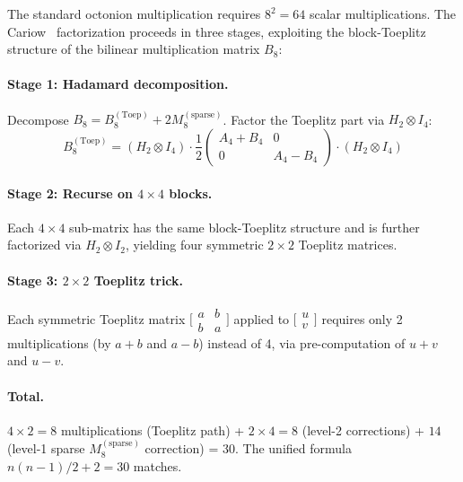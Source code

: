 \documentclass[sigconf,anonymous,review]{acmart}
\begin{document}
The standard octonion multiplication requires $8^2 = 64$ scalar
multiplications. The Cariow~\cite{cariow2012} factorization proceeds
in three stages, exploiting the block-Toeplitz structure of the
bilinear multiplication matrix $B_8$:

\paragraph{Stage 1: Hadamard decomposition.}
Decompose $B_8 = B_8^{(\text{Toep})} + 2M_8^{(\text{sparse})}$.
Factor the Toeplitz part via $H_2 \otimes I_4$:
\begin{equation}
  B_8^{(\text{Toep})} = (H_2 \otimes I_4) \cdot \frac{1}{2}
    \begin{pmatrix} A_4 + B_4 & 0 \\ 0 & A_4 - B_4 \end{pmatrix}
    \cdot (H_2 \otimes I_4)
\end{equation}

\paragraph{Stage 2: Recurse on $4 \times 4$ blocks.}
Each $4 \times 4$ sub-matrix has the same block-Toeplitz structure
and is further factorized via $H_2 \otimes I_2$, yielding four
symmetric $2 \times 2$ Toeplitz matrices.

\paragraph{Stage 3: $2 \times 2$ Toeplitz trick.}
Each symmetric Toeplitz matrix
$\bigl[\begin{smallmatrix} a & b \\ b & a \end{smallmatrix}\bigr]$
applied to $\bigl[\begin{smallmatrix} u \\ v \end{smallmatrix}\bigr]$
requires only 2 multiplications (by $a{+}b$ and $a{-}b$) instead of 4,
via pre-computation of $u{+}v$ and $u{-}v$.

\paragraph{Total.}
$4 \times 2 = 8$ multiplications (Toeplitz path) +
$2 \times 4 = 8$ (level-2 corrections) +
$14$ (level-1 sparse $M_8^{(\text{sparse})}$ correction) = 30.
The unified formula $n(n{-}1)/2 + 2 = 30$ matches.
\end{document}

